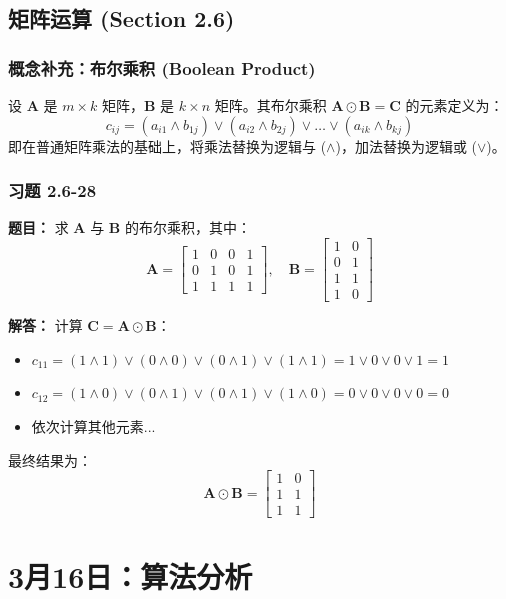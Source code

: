 \documentclass[11pt,UTF8]{article}
\begin{document}
\subsection{矩阵运算 (Section 2.6)}

\subsubsection*{概念补充：布尔乘积 (Boolean Product)}
设 $\mathbf{A}$ 是 $m \times k$ 矩阵，$\mathbf{B}$ 是 $k \times n$ 矩阵。其布尔乘积 $\mathbf{A} \odot \mathbf{B} = \mathbf{C}$ 的元素定义为：
\[ c_{ij} = (a_{i1} \land b_{1j}) \lor (a_{i2} \land b_{2j}) \lor \dots \lor (a_{ik} \land b_{kj}) \]
即在普通矩阵乘法的基础上，将乘法替换为逻辑与 ($\land$)，加法替换为逻辑或 ($\lor$)。

\subsubsection*{习题 2.6-28}
\textbf{题目：} 求 $\mathbf{A}$ 与 $\mathbf{B}$ 的布尔乘积，其中：
\[ \mathbf{A} = \begin{bmatrix} 1 & 0 & 0 & 1 \\ 0 & 1 & 0 & 1 \\ 1 & 1 & 1 & 1 \end{bmatrix}, \quad \mathbf{B} = \begin{bmatrix} 1 & 0 \\ 0 & 1 \\ 1 & 1 \\ 1 & 0 \end{bmatrix} \]

\textbf{解答：}
计算 $\mathbf{C} = \mathbf{A} \odot \mathbf{B}$：
\begin{itemize}
    \item $c_{11} = (1\land 1) \lor (0\land 0) \lor (0\land 1) \lor (1\land 1) = 1 \lor 0 \lor 0 \lor 1 = 1$
    \item $c_{12} = (1\land 0) \lor (0\land 1) \lor (0\land 1) \lor (1\land 0) = 0 \lor 0 \lor 0 \lor 0 = 0$
    \item 依次计算其他元素...
\end{itemize}
最终结果为：
\[ \mathbf{A} \odot \mathbf{B} = \begin{bmatrix} 1 & 0 \\ 1 & 1 \\ 1 & 1 \end{bmatrix} \]

\newpage

\section{3月16日：算法分析}
\end{document}

